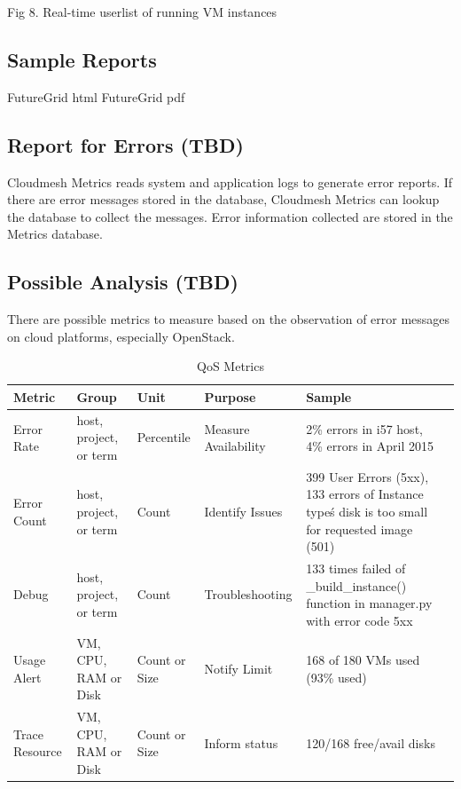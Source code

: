 \documentclass{sig-alternate-05-2015}
\begin{document}
Fig 8. Real-time userlist of running VM instances

\subsection{Sample Reports}

FutureGrid html \cite{LeeFGresourceWeb}
 FutureGrid pdf \cite{LeeFGresource}

\subsection{Report for Errors (TBD)}

Cloudmesh Metrics reads system and application logs to generate error reports. If there are error messages stored in the database, Cloudmesh Metrics can lookup the database to collect the messages. Error information collected are stored in the Metrics database.

\subsection{Possible Analysis (TBD)}

There are possible metrics to measure based on the observation of error messages on cloud platforms, especially OpenStack.

\begin{table}[htb]
\caption{QoS Metrics}
\begin{scriptsize}
\label{T:metrics}
\bigskip
\begin{center}
\begin{tabular}{lp{}p{}p{}p{}p{}}
Metric & Group & Unit & Purpose & Sample \\
\hline
Error Rate &
host, project, or term &
Percentile &
Measure Availability &
2\% errors in i57 host, 4\% errors in April 2015 \\
\hline
Error Count &
host, project, or term &
Count & 
Identify Issues &
399 User Errors (5xx), 133 errors of Instance type\'s disk is too small for requested image (501) \\
\hline
Debug &
host, project, or term &
Count &
Troubleshooting &
133 times failed of \_build\_instance() function in manager.py with error code 5xx \\
\hline
Usage Alert &
VM, CPU, RAM or Disk &
Count or Size &
Notify Limit &
168 of 180 VMs used (93\% used) \\
\hline
Trace Resource  &
VM, CPU, RAM or Disk &
Count or Size &
Inform status &
120/168 free/avail disks \\
\hline
\end{tabular}
\end{center}
\end{scriptsize}
\end{table}
\end{document}

